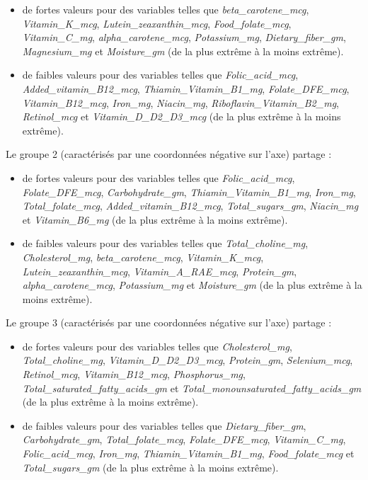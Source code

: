 \documentclass[]{article}
\providecommand{\tightlist}{%
  \setlength{\itemsep}{0pt}\setlength{\parskip}{0pt}}
\begin{document}
\begin{itemize}
\tightlist
\item
  de fortes valeurs pour des variables telles que
  \emph{beta\_carotene\_mcg}, \emph{Vitamin\_K\_mcg},
  \emph{Lutein\_zeaxanthin\_mcg}, \emph{Food\_folate\_mcg},
  \emph{Vitamin\_C\_mg}, \emph{alpha\_carotene\_mcg},
  \emph{Potassium\_mg}, \emph{Dietary\_fiber\_gm}, \emph{Magnesium\_mg}
  et \emph{Moisture\_gm} (de la plus extrême à la moins extrême).
\item
  de faibles valeurs pour des variables telles que
  \emph{Folic\_acid\_mcg}, \emph{Added\_vitamin\_B12\_mcg},
  \emph{Thiamin\_Vitamin\_B1\_mg}, \emph{Folate\_DFE\_mcg},
  \emph{Vitamin\_B12\_mcg}, \emph{Iron\_mg}, \emph{Niacin\_mg},
  \emph{Riboflavin\_Vitamin\_B2\_mg}, \emph{Retinol\_mcg} et
  \emph{Vitamin\_D\_D2\_D3\_mcg} (de la plus extrême à la moins
  extrême).
\end{itemize}

Le groupe 2 (caractérisés par une coordonnées négative sur l'axe)
partage :

\begin{itemize}
\tightlist
\item
  de fortes valeurs pour des variables telles que
  \emph{Folic\_acid\_mcg}, \emph{Folate\_DFE\_mcg},
  \emph{Carbohydrate\_gm}, \emph{Thiamin\_Vitamin\_B1\_mg},
  \emph{Iron\_mg}, \emph{Total\_folate\_mcg},
  \emph{Added\_vitamin\_B12\_mcg}, \emph{Total\_sugars\_gm},
  \emph{Niacin\_mg} et \emph{Vitamin\_B6\_mg} (de la plus extrême à la
  moins extrême).
\item
  de faibles valeurs pour des variables telles que
  \emph{Total\_choline\_mg}, \emph{Cholesterol\_mg},
  \emph{beta\_carotene\_mcg}, \emph{Vitamin\_K\_mcg},
  \emph{Lutein\_zeaxanthin\_mcg}, \emph{Vitamin\_A\_RAE\_mcg},
  \emph{Protein\_gm}, \emph{alpha\_carotene\_mcg}, \emph{Potassium\_mg}
  et \emph{Moisture\_gm} (de la plus extrême à la moins extrême).
\end{itemize}

Le groupe 3 (caractérisés par une coordonnées négative sur l'axe)
partage :

\begin{itemize}
\tightlist
\item
  de fortes valeurs pour des variables telles que
  \emph{Cholesterol\_mg}, \emph{Total\_choline\_mg},
  \emph{Vitamin\_D\_D2\_D3\_mcg}, \emph{Protein\_gm},
  \emph{Selenium\_mcg}, \emph{Retinol\_mcg}, \emph{Vitamin\_B12\_mcg},
  \emph{Phosphorus\_mg}, \emph{Total\_saturated\_fatty\_acids\_gm} et
  \emph{Total\_monounsaturated\_fatty\_acids\_gm} (de la plus extrême à
  la moins extrême).
\item
  de faibles valeurs pour des variables telles que
  \emph{Dietary\_fiber\_gm}, \emph{Carbohydrate\_gm},
  \emph{Total\_folate\_mcg}, \emph{Folate\_DFE\_mcg},
  \emph{Vitamin\_C\_mg}, \emph{Folic\_acid\_mcg}, \emph{Iron\_mg},
  \emph{Thiamin\_Vitamin\_B1\_mg}, \emph{Food\_folate\_mcg} et
  \emph{Total\_sugars\_gm} (de la plus extrême à la moins extrême).
\end{itemize}
\end{document}
